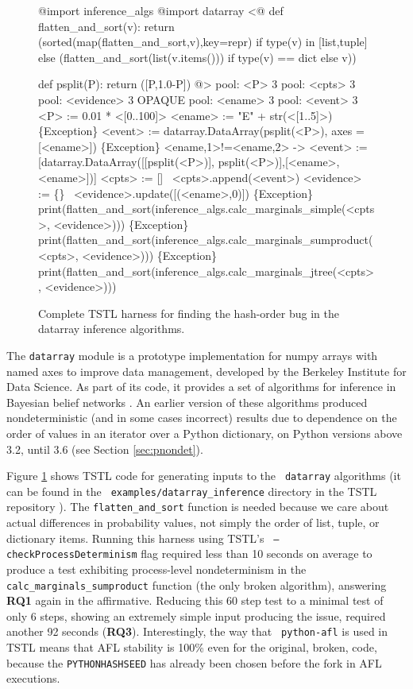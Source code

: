 \begin{figure}[t]
{\scriptsize
\begin{code}
@import inference\_algs
@import datarray
\vspace{0.1in}
<@
def flatten\_and\_sort(v):
    return (sorted(map(flatten\_and\_sort,v),key=repr) if type(v) in [list,tuple] else
                (flatten\_and\_sort(list(v.items())) if type(v) == dict else v))

def psplit(P):
    return ([P,1.0-P])
@>
\vspace{0.1in}
pool: <P> 3
pool: <cpts> 3
pool: <evidence> 3 OPAQUE
pool: <ename> 3
pool: <event> 3
\vspace{0.1in}
<P> := 0.01 * <[0..100]>
<ename> := "E" + str(<[1..5]>)
\{Exception\} <event> := datarray.DataArray(psplit(<P>), axes = [<ename>])
\{Exception\} <ename,1>!=<ename,2> -> <event> := [datarray.DataArray([[psplit(<P>)],
   psplit(<P>)],[<ename>,<ename>])]
<cpts> := []
~<cpts>.append(<event>)
<evidence> := \{\}
~<evidence>.update([(<ename>,0)])
\vspace{0.1in}
\{Exception\} print(flatten\_and\_sort(inference\_algs.calc\_marginals\_simple(<cpts>,
   <evidence>)))
\{Exception\} print(flatten\_and\_sort(inference\_algs.calc\_marginals\_sumproduct(<cpts>,
   <evidence>)))
\{Exception\} print(flatten\_and\_sort(inference\_algs.calc\_marginals\_jtree(<cpts>,
   <evidence>)))
\end{code}
}
\caption {Complete TSTL harness for finding the hash-order bug in the datarray
  inference algorithms.}
\label{hashbug}
\end{figure}

The {\tt datarray} module \cite{datarray} is a prototype
implementation for numpy arrays with named axes to improve data
management, developed by the Berkeley Institute for Data Science.  As part of its code, it provides a set of algorithms for
inference in
Bayesian belief networks \cite{russell2016artificial}.  An earlier
version of these algorithms produced nondeterministic (and in some
cases incorrect) results due to dependence on the order of values in
an iterator over a Python dictionary, on Python versions above 3.2,
until 3.6 (see Section \ref{sec:pnondet}).  

Figure \ref{hashbug} shows TSTL code for generating inputs to the {\tt
  datarray} algorithms (it can be found in the {\tt
  examples/datarray\_inference} directory in the TSTL repository \cite{tstl}).  The {\tt flatten\_and\_sort} function is needed because we care about actual differences in probability values, not simply the order of list, tuple, or dictionary items.  Running this harness using TSTL's {\tt
  --checkProcessDeterminism} flag required less than 10 seconds on
average to produce a test exhibiting process-level nondeterminism in
the {\tt calc\_marginals\_sumproduct} function (the only broken
algorithm), answering {\bf RQ1} again in the affirmative.  Reducing this 60 step test to a minimal test of only 6 steps,
showing an extremely simple input producing the issue, 
required another 92 seconds ({\bf RQ3}).  Interestingly, the way that {\tt
  python-afl} is used in TSTL means that AFL stability is 100\% even
for the original, broken, code,
because the {\tt PYTHONHASHSEED} has already been chosen before the
fork in AFL executions.

